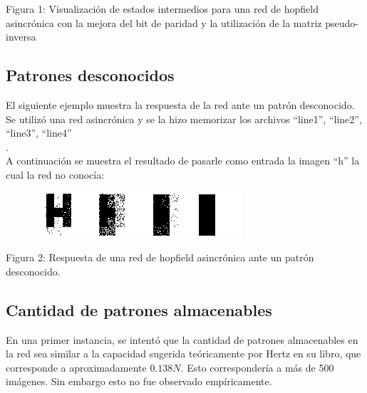 \documentclass[%
    final,
    reprint,
    notitlepage,
    narroweqnarray,
    inline,
    twoside,
    invited
    ]{ieee}
\begin{document}
\begin{center}
\par Figura 1: Visualización de estados intermedios para una red de hopfield asincrónica con la mejora del bit de paridad y la utilización de la matriz pseudo-inversa
\end{center}

\subsection{Patrones desconocidos}

\par El siguiente ejemplo muestra la respuesta de la red ante un patrón desconocido. Se utilizó una red asincrónica y se la hizo memorizar los archivos ``line1'', ``line2'', ``line3'', ``line4''\\.\\
A continuación se muestra el resultado de pasarle como entrada la imagen ``h''  la cual la red no conocía: \\

\begin{figure}[H]
\begin{center}
\includegraphics[scale=0.60]{./images/hnoinvnopar.png}
\label{modelado}
\end{center}
\end{figure}

\begin{center}
\par Figura 2: Respuesta de una red de hopfield asincrónica ante un patrón desconocido.
\end{center}


\subsection{Cantidad de patrones almacenables}

\par En una primer instancia, se intentó que la cantidad de patrones almacenables en la red 
sea similar a la capacidad sugerida teóricamente por Hertz en su libro, que corresponde a aproximadamente 
$0.138N$. Esto correspondería a más de 500 imágenes. Sin embargo esto no fue observado empíricamente.
\end{document}
